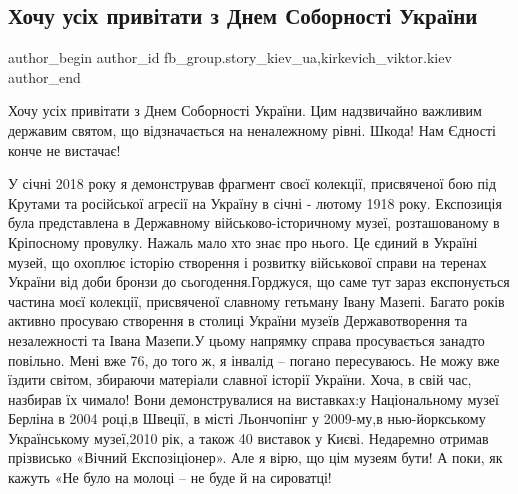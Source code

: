  
 
 
 
 
 
\subsection{Хочу усіх привітати з Днем Соборності України}
\label{sec:22_01_2022.fb.fb_group.story_kiev_ua.1.den_sobornosti_ukrainy}
 
\ifcmt
 author_begin
   author_id fb_group.story_kiev_ua,kirkevich_viktor.kiev
 author_end
\fi

Хочу усіх привітати з Днем Соборності України. Цим надзвичайно важливим
державим святом, що відзначається на неналежному рівні. Шкода! Нам Єдності конче
не вистачає!


У січні 2018 року я демонстрував фрагмент своєї колекції, присвяченої бою під
Крутами та російської агресії на Україну в січні - лютому 1918 року. Експозиція
була представлена в Державному військово-історичному музеї, розташованому в
Кріпосному провулку. Нажаль мало хто знає про нього. Це єдиний в Україні музей,
що охоплює історію створення і розвитку військової справи на теренах України
від доби бронзи до сьогодення.Горджуся, що саме тут зараз експонується частина
моєї колекції, присвяченої славному гетьману Івану Мазепі. Багато років активно
просуваю створення в столиці України музеїв Державотворення та незалежності та
Івана Мазепи.У цьому напрямку справа просувається занадто повільно. Мені вже
76, до того ж, я інвалід – погано пересуваюсь. Не можу вже їздити світом,
збираючи матеріали славної історії України. Хоча, в свій час, назбирав їх
чимало! Вони демонструвалися на виставках:у Національному музеї Берліна в 2004
році,в Швеції, в місті Льончопінг у 2009-му,в нью-йоркському Українському
музеї,2010 рік, а також 40 виставок у Києві. Недаремно отримав прізвисько
«Вічний Експозіціонер». Але я вірю, що цім музеям бути! А поки, як кажуть «Не
було на молоці – не буде й на сироватці!

